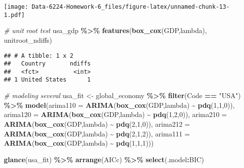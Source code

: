 \documentclass[
]{article}
\newenvironment{Shaded}{\begin{snugshade}}{\end{snugshade}}
\newcommand{\AttributeTok}[1]{\textcolor[rgb]{0.13,0.29,0.53}{#1}}
\newcommand{\CommentTok}[1]{\textcolor[rgb]{0.56,0.35,0.01}{\textit{#1}}}
\newcommand{\DecValTok}[1]{\textcolor[rgb]{0.00,0.00,0.81}{#1}}
\newcommand{\FunctionTok}[1]{\textcolor[rgb]{0.13,0.29,0.53}{\textbf{#1}}}
\newcommand{\NormalTok}[1]{#1}
\newcommand{\OtherTok}[1]{\textcolor[rgb]{0.56,0.35,0.01}{#1}}
\newcommand{\SpecialCharTok}[1]{\textcolor[rgb]{0.81,0.36,0.00}{\textbf{#1}}}
\newcommand{\StringTok}[1]{\textcolor[rgb]{0.31,0.60,0.02}{#1}}
\begin{document}
\texttt{[image: Data-6224-Homework-6\_files/figure-latex/unnamed-chunk-13-1.pdf]}

\begin{Shaded}
\begin{Highlighting}[]
\CommentTok{\# unit root test}
\NormalTok{usa\_gdp }\SpecialCharTok{\%\textgreater{}\%}
  \FunctionTok{features}\NormalTok{(}\FunctionTok{box\_cox}\NormalTok{(GDP,lambda), unitroot\_ndiffs) }
\end{Highlighting}
\end{Shaded}

\begin{verbatim}
## # A tibble: 1 x 2
##   Country       ndiffs
##   <fct>          <int>
## 1 United States      1
\end{verbatim}

\begin{Shaded}
\begin{Highlighting}[]
\CommentTok{\# modeling several }
\NormalTok{usa\_fit }\OtherTok{\textless{}{-}}\NormalTok{ global\_economy }\SpecialCharTok{\%\textgreater{}\%}
  \FunctionTok{filter}\NormalTok{(Code }\SpecialCharTok{==} \StringTok{"USA"}\NormalTok{) }\SpecialCharTok{\%\textgreater{}\%}
  \FunctionTok{model}\NormalTok{(}\AttributeTok{arima110 =} \FunctionTok{ARIMA}\NormalTok{(}\FunctionTok{box\_cox}\NormalTok{(GDP,lambda) }\SpecialCharTok{\textasciitilde{}} \FunctionTok{pdq}\NormalTok{(}\DecValTok{1}\NormalTok{,}\DecValTok{1}\NormalTok{,}\DecValTok{0}\NormalTok{)),}
        \AttributeTok{arima120 =} \FunctionTok{ARIMA}\NormalTok{(}\FunctionTok{box\_cox}\NormalTok{(GDP,lambda) }\SpecialCharTok{\textasciitilde{}} \FunctionTok{pdq}\NormalTok{(}\DecValTok{1}\NormalTok{,}\DecValTok{2}\NormalTok{,}\DecValTok{0}\NormalTok{)),}
        \AttributeTok{arima210 =} \FunctionTok{ARIMA}\NormalTok{(}\FunctionTok{box\_cox}\NormalTok{(GDP,lambda) }\SpecialCharTok{\textasciitilde{}} \FunctionTok{pdq}\NormalTok{(}\DecValTok{2}\NormalTok{,}\DecValTok{1}\NormalTok{,}\DecValTok{0}\NormalTok{)),}
        \AttributeTok{arima212 =} \FunctionTok{ARIMA}\NormalTok{(}\FunctionTok{box\_cox}\NormalTok{(GDP,lambda) }\SpecialCharTok{\textasciitilde{}} \FunctionTok{pdq}\NormalTok{(}\DecValTok{2}\NormalTok{,}\DecValTok{1}\NormalTok{,}\DecValTok{2}\NormalTok{)),}
        \AttributeTok{arima111 =} \FunctionTok{ARIMA}\NormalTok{(}\FunctionTok{box\_cox}\NormalTok{(GDP,lambda) }\SpecialCharTok{\textasciitilde{}} \FunctionTok{pdq}\NormalTok{(}\DecValTok{1}\NormalTok{,}\DecValTok{1}\NormalTok{,}\DecValTok{1}\NormalTok{)))}

\FunctionTok{glance}\NormalTok{(usa\_fit) }\SpecialCharTok{\%\textgreater{}\%} \FunctionTok{arrange}\NormalTok{(AICc) }\SpecialCharTok{\%\textgreater{}\%} \FunctionTok{select}\NormalTok{(.model}\SpecialCharTok{:}\NormalTok{BIC)}
\end{Highlighting}
\end{Shaded}
\end{document}
